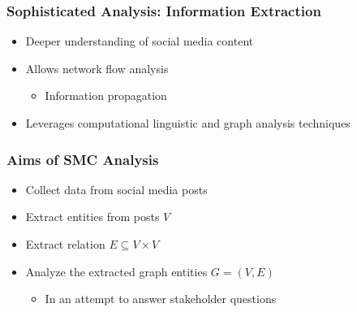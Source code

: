 \documentclass[xcolor=table]{beamer}
\newcommand{\bi}{\begin{itemize}}
\newcommand{\ei}{\end{itemize}}
\newcommand{\I}{\item}
\begin{document}
\begin{frame}
\frametitle{Sophisticated Analysis: Information Extraction}
\begin{itemize}
\item Deeper understanding of social media content
\item Allows network flow analysis
\begin{itemize}
\item Information propagation
\end{itemize}
\item Leverages computational linguistic and graph analysis techniques
\end{itemize}

\end{frame}



\begin{frame}
\frametitle{Aims of SMC Analysis }

\begin{itemize}
\item Collect data from social media posts
\item Extract entities from posts $V$
\item Extract relation $E \subseteq V \times V$
\item Analyze the extracted graph entities $G=(V,E)$ 
   \bi
   \I In an attempt to answer stakeholder questions
   \ei

\end{itemize}

\end{frame}

\end{document}
